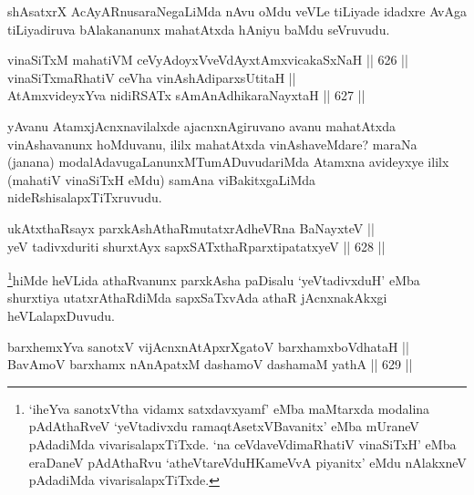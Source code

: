 \begin{artha}
shAsatxrX AcAyARnusaraNegaLiMda nAvu oMdu veVLe tiLiyade idadxre AvAga
tiLiyadiruva bAlakananunx mahatAtxda hAniyu baMdu seVruvudu.
\end{artha}

\begin{shl}
vinaSiTxM mahatiVM ceVyAdoyxV\s veVdAyxtAmx\s vicakaSxNaH \hfill || 626 ||  \\
vinaSiTxmaRhatiV ceVha vinAshAdiparxsUtitaH ||  \\
AtAmxvideyxYva nidiRSATx sAmAnAdhikaraNayxtaH \hfill || 627 ||  
\end{shl}

\begin{artha}
yAvanu AtamxjAcnxnavilalxde ajacnxnAgiruvano avanu mahatAtxda vinAshavanunx hoMduvanu, ililx mahatAtxda vinAshaveMdare? maraNa
(janana) modalAdavugaLanunxMTumADuvudariMda Atamxna avideyxye ililx (mahatiV vinaSiTxH eMdu) samAna viBakitxgaLiMda nideRshisalapxTiTxruvudu.
\end{artha}

\begin{shl}
ukAtxthaRsayx parxkAshAthaRmutatxrAdheVRna BaNayxteV || \\
yeV tadivxduriti shurxtAyx sapxSATxthaRparxtipatatxyeV \hfill || 628 ||  
\end{shl}

\begin{artha}
\footnote{`iheYva sanotxV\s tha vidamx satxdavxyamf' eMba maMtarxda modalina pAdAthaRveV `yeVtadivxdu ramaqtAsetxVBavanitx' eMba mUraneV pAdadiMda vivarisalapxTiTxde. `na ceVdaveVdimaRhatiV vinaSiTxH' eMba eraDaneV pAdAthaRvu `atheVtareVduHKameVvA piyanitx' eMdu nAlakxneV pAdadiMda vivarisalapxTiTxde.}hiMde heVLida athaRvanunx parxkAsha paDisalu `yeVtadivxduH' eMba shurxtiya utatxrAthaRdiMda sapxSaTxvAda athaR jAcnxnakAkxgi heVLalapxDuvudu.
\end{artha}


\begin{shl}
barxhemxYva sanotxV vijAcnxnAtApxrXgatoV barxhamxboVdhataH || \\
BavAmoV barxhamx nAnApatxM dashamoV dashamaM yathA \hfill || 629 ||  
\end{shl}

